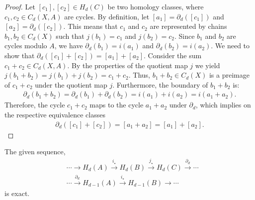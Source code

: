 \begin{proof}
	Let \([c_{1}], [c_{2}] \in H_{d}(C)\) be two homology classes, where \(c_{1}, c_{2} \in C_{d}(X, A)\) are cycles. By definition, let \([a_{1}] = \partial_{d}([c_{1}])\) and \([a_{2}] = \partial_{d}([c_{2}])\). This means that \(c_{1}\) and \(c_{2}\) are represented by chains \(b_{1}, b_{2} \in C_{d}(X)\) such that \(j(b_{1}) = c_{1}\) and \(j(b_{2}) = c_{2}\). Since \(b_{1}\) and \(b_{2}\) are cycles modulo \(A\), we have $\partial_{d}(b_{1}) = i(a_{1})$ and $\partial_{d}(b_{2}) = i(a_{2})$. We need to show that $\partial_{d}([c_{1}] + [c_{2}]) = [a_{1}] + [a_{2}]$. Consider the sum \(c_{1} + c_{2} \in C_{d}(X, A)\). By the properties of the quotient map \(j\) we yield $j(b_{1} + b_{2}) = j(b_{1}) + j(b_{2}) = c_{1} + c_{2}$. Thus, \(b_{1} + b_{2} \in C_{d}(X)\) is a preimage of \(c_{1} + c_{2}\) under the quotient map \(j\). Furthermore, the boundary of \(b_{1} + b_{2}\) is:
	\begin{align}
		\partial_{d}(b_{1} + b_{2}) = \partial_{d}(b_{1}) + \partial_{d}(b_{2}) = i(a_{1}) + i(a_{2}) = i(a_{1} + a_{2}). 
	\end{align}
	Therefore, the cycle \(c_{1} + c_{2}\) maps to the cycle \(a_{1} + a_{2}\) under \(\partial_{d}\), which implies on the respective equivalence classes
	\begin{align}
		\partial_{d}([c_{1}] + [c_{2}]) = [a_{1} + a_{2}] = [a_{1}] + [a_{2}]. 
	\end{align}
\end{proof}

\begin{lemma}{\cite[Theorem 2.16]{hatcher2005algebraic}}
	\label{exacthomsequence}
	The given sequence,
	\begin{align}
		  & \cdots \rightarrow H_{d}(A) \xrightarrow{i_\star} H_{d}(B) \xrightarrow{j_\star} H_{d}(C) \xrightarrow{\partial_d} \cdots \nonumber\\
		  & \cdots \xrightarrow{\partial_d} H_{d-1}(A) \xrightarrow{i_\star} H_{d-1}(B) \rightarrow \cdots                            
	\end{align}
	is exact.
\end{lemma}

